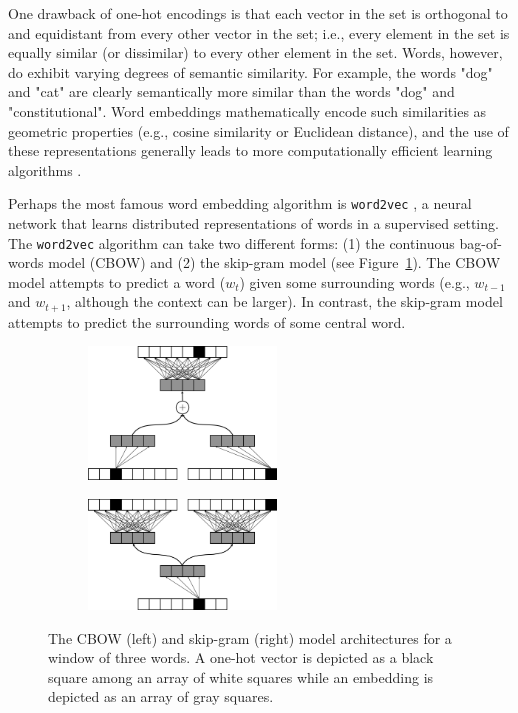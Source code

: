 \documentclass{article}
\begin{document}
One drawback of one-hot encodings is that each vector in the set is orthogonal to and equidistant from every other vector in the set; i.e., every element in the set is equally similar (or dissimilar) to every other element in the set. Words, however, do exhibit varying degrees of semantic similarity. For example, the words "dog" and "cat" are clearly semantically more similar than the words "dog" and "constitutional". Word embeddings mathematically encode such similarities as geometric properties (e.g., cosine similarity or Euclidean distance), and the use of these representations generally leads to more computationally efficient learning algorithms \parencite{Bengio2003}.

Perhaps the most famous word embedding algorithm is \texttt{word2vec} \parencite{Mikolov2013}, a neural network that learns distributed representations of words in a supervised setting. The \texttt{word2vec} algorithm can take two different forms: (1) the continuous bag-of-words model (CBOW) and (2) the skip-gram model (see Figure~\ref{fig:word2vec}). The CBOW model attempts to predict a word ($w_t$) given some surrounding words (e.g., $w_{t-1}$ and $w_{t+1}$, although the context can be larger). In contrast, the skip-gram model attempts to predict the surrounding words of some central word.

\begin{figure}[h]
\captionsetup[subfigure]{labelformat=empty}
\centering

    \begin{subfigure}[t]{0.45\textwidth}
    \centering
    \includegraphics[width=5cm]{cbow_fig.png}
    \caption{}
    \end{subfigure}%
    \begin{subfigure}[t]{0.45\textwidth}
    \centering
    \includegraphics[width=5cm]{skip_gram.png}
    \caption{}
    \end{subfigure}

\caption{The CBOW (left) and skip-gram (right) model architectures for a window of three words. A one-hot vector is depicted as a black square among an array of white squares while an embedding is depicted as an array of gray squares.}
\label{fig:word2vec}
\end{figure}
\end{document}
